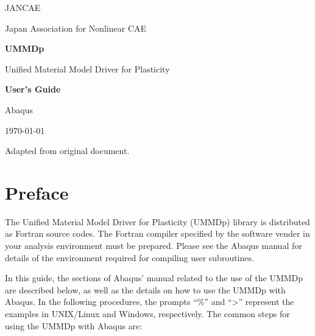 \documentclass[11pt,a4paper,twoside,final,onecolumn,titlepage]{article}
\begin{document}
\begin{titlepage}
\LARGE JANCAE

\large Japan Association for Nonlinear CAE

\vspace*{150pt}
\Huge \textbf{UMMDp}

\vspace*{10pt}
\LARGE Unified Material Model Driver for Plasticity

\vspace*{50pt}
\begin{flushright}
\Huge \textbf{User's Guide}

\LARGE Abaqus
\end{flushright}

\vspace*{50pt}
\begin{center}

\vspace*{180pt}
\large \today

\large Adapted from original document.

\end{center}
\end{titlepage}

\tableofcontents

\newpage
\section{Preface}
\vspace{0.5cm}

The Unified Material Model Driver for Plasticity (UMMDp) library is distributed as Fortran source codes. The Fortran compiler specified by the software vender in your analysis environment must be prepared. Please see the Abaqus manual for details of the environment required for compiling user subroutines.

In this guide, the sections of Abaqus' manual related to the use of the UMMDp are described below, as well as the details on how to use the UMMDp with Abaqus. In the following procedures, the prompts “\%” and “\textgreater” represent the examples in UNIX/Linux and Windows, respectively. The common steps for using the UMMDp with Abaqus are:
\end{document}
